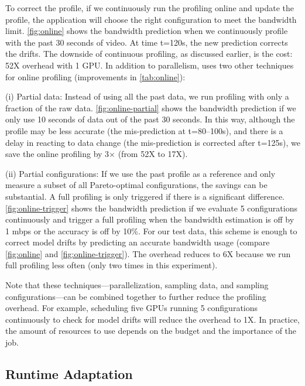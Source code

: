 To correct the profile, if we continuously run the profiling online and update
the profile, the application will choose the right configuration to meet the
bandwidth limit.  \autoref{fig:online} shows the bandwidth prediction when we
continuously profile with the past 30 seconds of video. At time t=120s, the new
prediction corrects the drifts. The downside of continuous profiling, as
discussed earlier, is the cost: 52X overhead with 1 GPU\@. In addition to
parallelism, \sysname{} uses two other techniques for online profiling
(improvements in \autoref{tab:online}):

(i) Partial data: Instead of using all the past data, we run profiling with only
a fraction of the raw data.  \autoref{fig:online-partial} shows the bandwidth
prediction if we only use 10 seconds of data out of the past 30 seconds. In this
way, although the profile may be less accurate (the mis-prediction at
t=80--100s), and there is a delay in reacting to data change (the mis-prediction
is corrected after t=125s), we save the online profiling by 3$\times$ (from 52X
to 17X).

(ii) Partial configurations: If we use the past profile as a reference and only
measure a subset of all Pareto-optimal configurations, the savings can be
substantial. A full profiling is only triggered if there is a significant
difference. \autoref{fig:online-trigger} shows the bandwidth prediction if we
evaluate 5 configurations continuously and trigger a full profiling when the
bandwidth estimation is off by 1 mbps or the accuracy is off by 10\%.  For our
test data, this scheme is enough to correct model drifts by predicting an
accurate bandwidth usage (compare \autoref{fig:online} and
\autoref{fig:online-trigger}).  The overhead reduces to 6X because we run full
profiling less often (only two times in this experiment).

Note that these techniques---parallelization, sampling data, and sampling
configurations---can be combined together to further reduce the profiling
overhead. For example, scheduling five GPUs running 5 configurations
continuously to check for model drifts will reduce the overhead to 1X\@. In
practice, the amount of resources to use depends on the budget and the
importance of the job.


\subsection{Runtime Adaptation}
\label{sec:runtime-adaptation}

